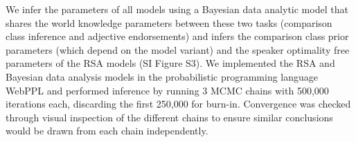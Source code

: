 \documentclass[doc]{apa6}
\begin{document}




We infer the parameters of all models using a Bayesian data analytic model that shares the world knowledge parameters between these two tasks (comparison class inference and adjective endorsements) and infers the comparison class prior parameters (which depend on the model variant) and the speaker optimality free parameters of the RSA models (SI Figure S3).
We implemented the RSA and Bayesian data analysis models in the probabilistic programming language WebPPL \cite{dippl} and performed inference by running 3 MCMC chains with 500,000 iterations each, discarding the first 250,000 for burn-in.
Convergence was checked through visual inspection of the different chains to ensure similar conclusions would be drawn from each chain independently.
\end{document}

